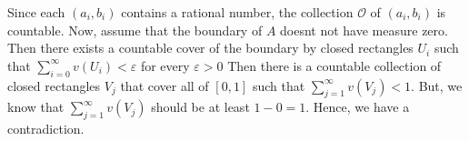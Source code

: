 \begin{solution}
    Since each $(a_i,b_i)$ contains a
    rational number, the collection 
    $\mathscr{O}$ of
    $(a_i, b_i)$ is countable. Now,
    assume that
    the boundary of $A$ doesnt not have
    measure zero. Then there exists a
    countable cover of the boundary by
    closed rectangles $U_i$ such that
    $\sum_{i=0}^{\infty}{v(U_i)}<
    \varepsilon$ for every $\varepsilon
    >0$ Then there is a
    countable collection of closed
    rectangles $V_j$ that cover all of
    $[0,1]$ such that $\sum_{j=1}^
    {\infty}{v(V_j)}<1.$ But, we know
    that $\sum_{j=1}^
    {\infty}{v(V_j)}$ should be at least
    $1-0=1$. Hence, we have a
    contradiction.
\end{solution}